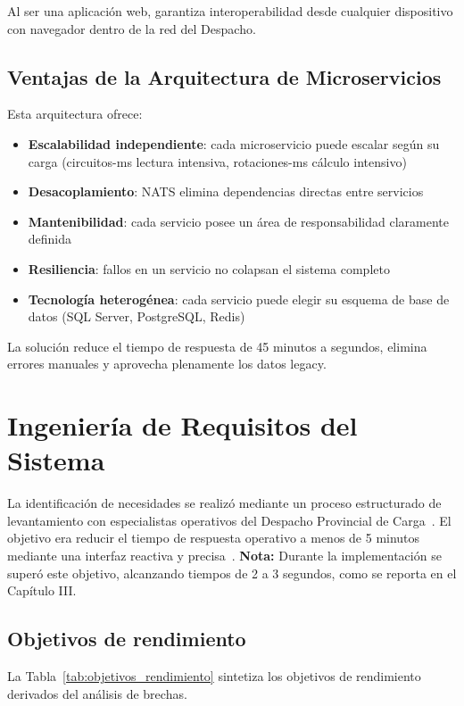 Al ser una aplicación web, garantiza interoperabilidad desde cualquier dispositivo con navegador dentro de la red del Despacho.

\subsection{Ventajas de la Arquitectura de Microservicios}
Esta arquitectura ofrece:

\begin{itemize}
    \item \textbf{Escalabilidad independiente}: cada microservicio puede escalar según su carga (circuitos-ms lectura intensiva, rotaciones-ms cálculo intensivo)
    \item \textbf{Desacoplamiento}: NATS elimina dependencias directas entre servicios
    \item \textbf{Mantenibilidad}: cada servicio posee un área de responsabilidad claramente definida
    \item \textbf{Resiliencia}: fallos en un servicio no colapsan el sistema completo
    \item \textbf{Tecnología heterogénea}: cada servicio puede elegir su esquema de base de datos (SQL Server, PostgreSQL, Redis)
\end{itemize}

La solución reduce el tiempo de respuesta de 45 minutos a segundos, elimina errores manuales y aprovecha plenamente los datos legacy.

\section{Ingeniería de Requisitos del Sistema}

La identificación de necesidades se realizó mediante un proceso estructurado de levantamiento con especialistas operativos del Despacho Provincial de Carga~\citep{union2023}. El objetivo era reducir el tiempo de respuesta operativo a menos de 5 minutos mediante una interfaz reactiva y precisa~\citep{pressman2020}. \textbf{Nota:} Durante la implementación se superó este objetivo, alcanzando tiempos de 2 a 3 segundos, como se reporta en el Capítulo III.

\subsection{Objetivos de rendimiento}
La Tabla~\ref{tab:objetivos_rendimiento} sintetiza los objetivos de rendimiento derivados del análisis de brechas.

